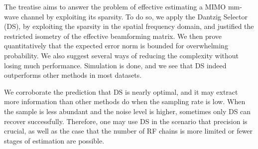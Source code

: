 
\startchapter [title={Conclusion}]

The treatise aims to answer the problem of effective estimating a MIMO mm-wave channel by exploiting its sparsity.
To do so, we apply the Dantzig Selector (DS), by exploiting the sparsity in the spatial frequency domain, and justified the restricted isometry of the effective beamforming matrix.
We then prove quantitatively that the expected error norm is bounded for overwhelming probability.
We also suggest several ways of reducing the complexity without losing much performance.
Simulation is done, and we see that DS indeed outperforms other methods in most datasets.

We corroborate the prediction that DS is nearly optimal, and it may extract more information than other methods do when the sampling rate is low.
When the sample is less abundant and the noise level is higher, sometimes only DS can recover successfully.
Therefore, one may use DS in the scenario that precision is crucial, as well as the case that the number of RF chains is more limited or fewer stages of estimation are possible.

\stopchapter


